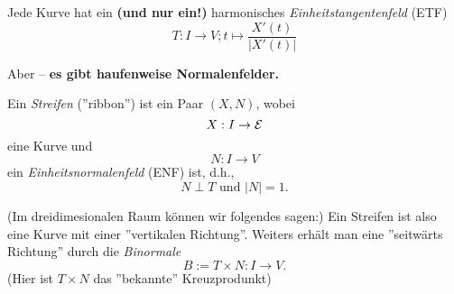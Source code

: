 \begin{remark, definition}

Jede Kurve hat ein \textbf{(und nur ein!)} harmonisches \emph{Einheitstangentenfeld} (ETF)
\[ T: I \rightarrow V; t \mapsto \frac{X'(t)}{|X'(t)|} \]

Aber -- \textbf{es gibt haufenweise Normalenfelder.}

\end{remark, definition}

\begin{definition}
	Ein \emph{Streifen} (''ribbon'') ist ein Paar $(X,N)$, wobei $$X:I \rightarrow \mathcal E$$ eine Kurve und $$ N: I \rightarrow V $$ ein \emph{Einheitsnormalenfeld} (ENF) ist, d.h.,
	\[N\perp T \text{ und } |N|=1. \]
\end{definition}

\begin{remark, definition}
	(Im dreidimesionalen Raum können wir folgendes sagen:)
	Ein Streifen ist also eine Kurve mit einer ''vertikalen Richtung''.
	Weiters erhält man eine ''seitwärts Richtung'' durch die \emph{Binormale} $$B:=T\times N : I\rightarrow V.$$ (Hier ist $T \times N$ das ''bekannte'' Kreuzprodunkt)
	
\end{remark, definition}

